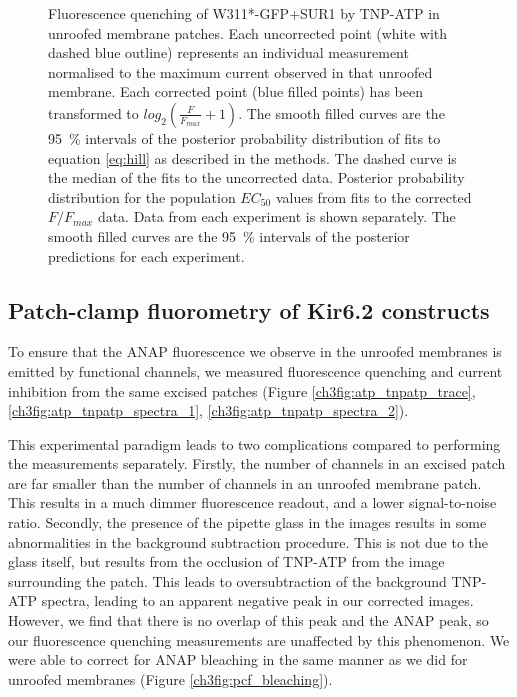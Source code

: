 \begin{figure}[h]
\begin{subfigure}[t]{0.9\textwidth}
	\end{subfigure}
	\caption[W311*-GFP unroofed membrane binding]{
	 Fluorescence quenching of W311*-GFP+SUR1 by TNP-ATP in unroofed membrane patches.
	Each uncorrected point (white with dashed blue outline) represents an individual measurement normalised to the maximum current observed in that unroofed membrane.
	Each corrected point (blue filled points) has been transformed to $log_2(\frac{F}{F_{max}}+1)$.
	The smooth filled curves are the \SI{95}{\percent} intervals of the posterior probability distribution of fits to equation \ref{eq:hill} as described in the methods.
	The dashed curve is the median of the fits to the uncorrected data.
	 Posterior probability distribution for the population $EC_{50}$ values from fits to the corrected $F/F_{max}$ data.
	 Data from each experiment is shown separately.
	The smooth filled curves are the \SI{95}{\percent} intervals of the posterior predictions for each experiment.
	}
\end{figure}

\subsection{Patch-clamp fluorometry of Kir6.2 constructs}

To ensure that the ANAP fluorescence we observe in the unroofed membranes is emitted by functional channels, we measured fluorescence quenching and current inhibition from the same excised patches (Figure \ref{ch3fig:atp_tnpatp_trace}, \ref{ch3fig:atp_tnpatp_spectra_1}, \ref{ch3fig:atp_tnpatp_spectra_2}).

This experimental paradigm leads to two complications compared to performing the measurements separately.
Firstly, the number of channels in an excised patch are far smaller than the number of channels in an unroofed membrane patch.
This results in a much dimmer fluorescence readout, and a lower signal-to-noise ratio.
Secondly, the presence of the pipette glass in the images results in some abnormalities in the background subtraction procedure.
This is not due to the glass itself, but results from the occlusion of TNP-ATP from the image surrounding the patch.
This leads to oversubtraction of the background TNP-ATP spectra, leading to an apparent negative peak in our corrected images.
However, we find that there is no overlap of this peak and the ANAP peak, so our fluorescence quenching measurements are unaffected by this phenomenon.
We were able to correct for ANAP bleaching in the same manner as we did for unroofed membranes (Figure \ref{ch3fig:pcf_bleaching}).

